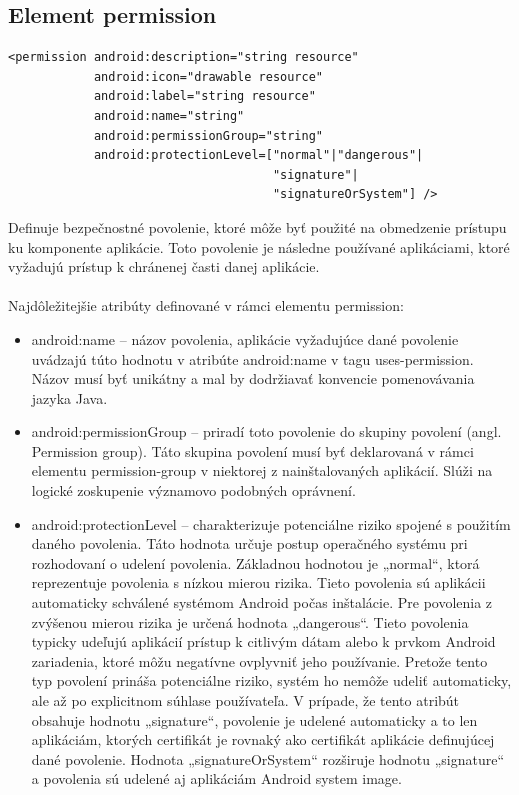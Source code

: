\subsection{Element permission}
\lstset{language=XML}
\begin{lstlisting}
<permission android:description="string resource"
            android:icon="drawable resource"
            android:label="string resource"
            android:name="string"
            android:permissionGroup="string"
            android:protectionLevel=["normal"|"dangerous"| 
                                     "signature"|
                                     "signatureOrSystem"] />
\end{lstlisting}
Definuje bezpečnostné povolenie, ktoré môže byť použité na obmedzenie prístupu ku komponente aplikácie. Toto povolenie je následne používané aplikáciami, ktoré vyžadujú prístup k chránenej časti danej aplikácie.\\\\ Najdôležitejšie atribúty definované v rámci elementu permission:\\
\begin{itemize}
\item android:name – názov povolenia, aplikácie vyžadujúce dané povolenie uvádzajú túto hodnotu v atribúte android:name v tagu uses-permission. Názov musí byť unikátny a mal by dodržiavať konvencie pomenovávania jazyka Java.
\item android:permissionGroup – priradí toto povolenie do skupiny povolení (angl. Permission group). Táto skupina povolení musí byť deklarovaná v rámci elementu permission-group v niektorej z nainštalovaných aplikácií. Slúži na logické zoskupenie významovo podobných oprávnení.
\item android:protectionLevel – charakterizuje potenciálne riziko spojené s použitím daného povolenia. Táto hodnota určuje postup operačného systému pri rozhodovaní o udelení povolenia. 
Základnou hodnotou je „normal“, ktorá reprezentuje povolenia s nízkou mierou rizika. Tieto povolenia sú aplikácii automaticky schválené systémom Android počas inštalácie. Pre povolenia z zvýšenou mierou rizika je určená hodnota „dangerous“. Tieto povolenia typicky udeľujú aplikácií prístup k citlivým dátam alebo k prvkom Android zariadenia, ktoré môžu negatívne ovplyvniť jeho používanie. Pretože tento typ povolení prináša potenciálne riziko, systém ho nemôže udeliť automaticky, ale až po explicitnom súhlase používateľa.
V prípade, že tento atribút obsahuje hodnotu „signature“, povolenie je udelené automaticky a to len aplikáciám, ktorých certifikát je rovnaký ako certifikát aplikácie definujúcej dané povolenie.   
Hodnota „signatureOrSystem“ rozširuje hodnotu „signature“ a povolenia sú udelené aj aplikáciám Android system image.
\end{itemize}

